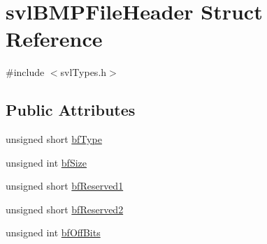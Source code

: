 \hypertarget{structsvl_b_m_p_file_header}{\section{svl\-B\-M\-P\-File\-Header Struct Reference}
\label{structsvl_b_m_p_file_header}
}


{\ttfamily \#include $<$svl\-Types.\-h$>$}

\subsection*{Public Attributes}
\begin{DoxyCompactItemize}
\item 
unsigned short \hyperlink{structsvl_b_m_p_file_header_a4e1fb2f5208ced50a9c740d301c967b7}{bf\-Type}
\item 
unsigned int \hyperlink{structsvl_b_m_p_file_header_afbba986523d6c2e3c43a9f34f11013b2}{bf\-Size}
\item 
unsigned short \hyperlink{structsvl_b_m_p_file_header_a497a191d181f6f89f2c6265d6a5cca6a}{bf\-Reserved1}
\item 
unsigned short \hyperlink{structsvl_b_m_p_file_header_aa184ab5d6c02e6f008dc0ee002efdaf5}{bf\-Reserved2}
\item 
unsigned int \hyperlink{structsvl_b_m_p_file_header_ac33b347e5a22419e98cd48c7b28f02da}{bf\-Off\-Bits}
\end{DoxyCompactItemize}


